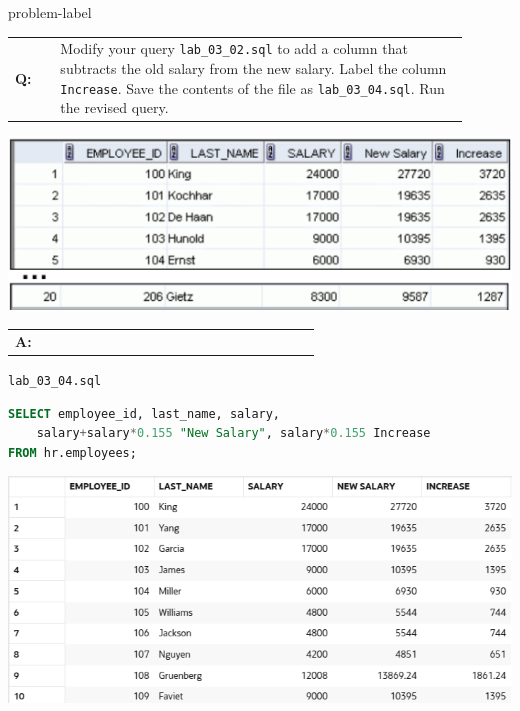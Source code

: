 \begin{problem}{}{problem-label}

\begin{tabular}{@{}l p{0.9\linewidth}@{}}
  \textbf{Q:} & Modify your query \texttt{lab\_03\_02.sql} to add a column that subtracts the old salary from the
new salary. Label the column \texttt{Increase}. Save the contents of the file as \texttt{lab\_03\_04.sql}.
Run the revised query.
\end{tabular}

\begin{center}
  \includegraphics[scale=0.8]{images/c3q4.png}
\end{center}

\begin{tabular}{@{}l p{0.9\linewidth}@{}}
  \textbf{A:} & 
\end{tabular}

\hspace{1.5em}\texttt{lab\_03\_04.sql}
\begin{lstlisting}[language=SQL]
SELECT employee_id, last_name, salary, 
    salary+salary*0.155 "New Salary", salary*0.155 Increase 
FROM hr.employees;
\end{lstlisting}

\vspace{1em}

\begin{center}
  \includegraphics[scale=0.5]{images/c3a4.png}
\end{center}

\end{problem}

